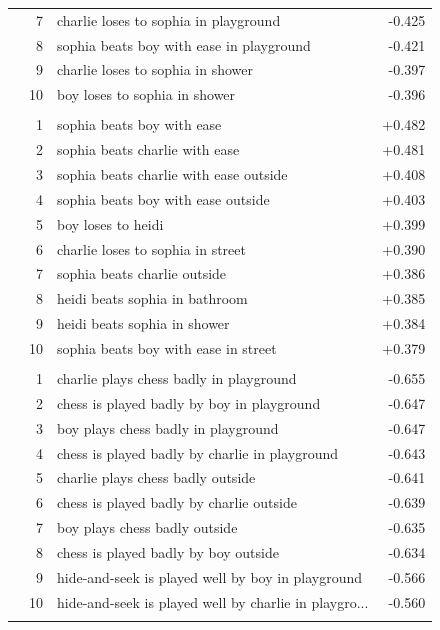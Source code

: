 \begin{longtable}{@{}lrlr@{}}
 & 7 & charlie loses to sophia in playground & -0.425 \\
 & 8 & sophia beats boy with ease in playground & -0.421 \\
 & 9 & charlie loses to sophia in shower & -0.397 \\
 & 10 & boy loses to sophia in shower & -0.396 \\
\addlinespace[3pt]
\multicolumn{4}{l}{\textit{Sentence -- Easiest}} \\
 & 1 & sophia beats boy with ease & +0.482 \\
 & 2 & sophia beats charlie with ease & +0.481 \\
 & 3 & sophia beats charlie with ease outside & +0.408 \\
 & 4 & sophia beats boy with ease outside & +0.403 \\
 & 5 & boy loses to heidi & +0.399 \\
 & 6 & charlie loses to sophia in street & +0.390 \\
 & 7 & sophia beats charlie outside & +0.386 \\
 & 8 & heidi beats sophia in bathroom & +0.385 \\
 & 9 & heidi beats sophia in shower & +0.384 \\
 & 10 & sophia beats boy with ease in street & +0.379 \\
\addlinespace
\multicolumn{4}{l}{\textit{Complex Event -- Hardest}} \\
 & 1 & charlie plays chess badly in playground & -0.655 \\
 & 2 & chess is played badly by boy in playground & -0.647 \\
 & 3 & boy plays chess badly in playground & -0.647 \\
 & 4 & chess is played badly by charlie in playground & -0.643 \\
 & 5 & charlie plays chess badly outside & -0.641 \\
 & 6 & chess is played badly by charlie outside & -0.639 \\
 & 7 & boy plays chess badly outside & -0.635 \\
 & 8 & chess is played badly by boy outside & -0.634 \\
 & 9 & hide-and-seek is played well by boy in playground & -0.566 \\
 & 10 & hide-and-seek is played well by charlie in playgro... & -0.560 \\
\addlinespace[3pt]
\multicolumn{4}{l}{\textit{Complex Event -- Easiest}} \\

\end{longtable}
